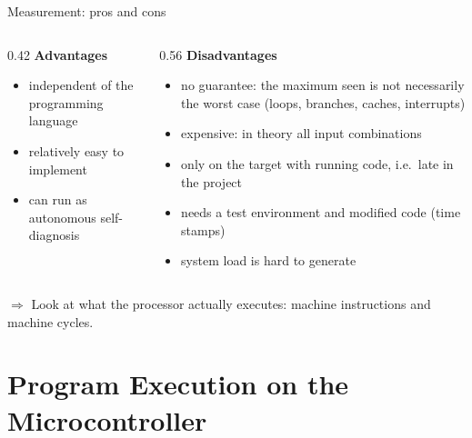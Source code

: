 \begin{frame}{Measurement: pros and cons}
  \begin{columns}[T]
    \begin{column}{0.42\textwidth}
      \textbf{Advantages}
      \begin{itemize}
        \item independent of the programming language
        \item relatively easy to implement
        \item can run as autonomous self-diagnosis
      \end{itemize}
    \end{column}
    \begin{column}{0.56\textwidth}
      \textbf{Disadvantages}
      \begin{itemize}
        \item no guarantee: the maximum seen is not necessarily the worst case (loops, branches, caches, interrupts)
        \item expensive: in theory all input combinations
        \item only on the target with running code, i.e.\ late in the project
        \item needs a test environment and modified code (time stamps)
        \item system load is hard to generate
      \end{itemize}
    \end{column}
  \end{columns}
  \medskip
  $\Rightarrow$ Look at what the processor actually executes: machine instructions and machine cycles.
\end{frame}

\section{Program Execution on the Microcontroller}
\label{sec:machine}

